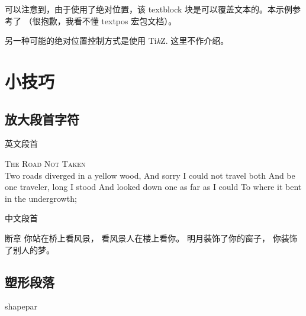 \documentclass[final]{ctexbeamer}
\begin{document}
\begin{frame}
可以注意到，由于使用了绝对位置，该 textblock 块是可以覆盖文本的。本示例参考了 \cite{stackexchange-abspos} （很抱歉，我看不懂 textpos 宏包文档）。

另一种可能的绝对位置控制方式是使用 Ti\emph{k}Z. 这里不作介绍。
\end{frame}



\section{小技巧}
\subsection{放大段首字符}
% 
\begin{frame}[fragile]{英文段首}
\begin{vertlst}
  
  \lettrine[lines=3]{T}{he Road Not Taken} \\
  Two roads diverged in a yellow wood,
  And sorry I could not travel both
  And be one traveler, long I stood
  And looked down one as far as I could
  To where it bent in the undergrowth;
\end{vertlst}
\end{frame}


\begin{frame}[fragile]{中文段首}
\begin{vertlst}
  \lettrine{断}{章}
  你站在桥上看风景，
  看风景人在楼上看你。
  明月装饰了你的窗子，
  你装饰了别人的梦。
  \end{vertlst}
\end{frame}



\subsection{塑形段落}
% 
\begin{frame}[fragile]{shapepar}
\begin{vertlst}
\small
\nutpar{\zhlipsum[2-3][name=nanshanjing]}
\end{vertlst}
\end{frame}


\begin{frame}[fragile]
\begin{vertlst}
\tiny{}
\end{vertlst}
\end{frame}
\end{document}
